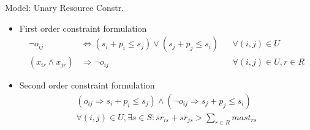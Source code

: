 \documentclass{beamer}
\begin{document}
\begin{frame}{Model: Unary Resource Constr.}
	\begin{itemize}
		\item First order constraint formulation
		\begin{align}
		    \neg o_{ij} 
		    & \Leftrightarrow (s_{i} + p_{i} \leq s_{j}) \vee (s_{j} + p_{j} \leq s_{i})
		    && \forall (i, j) \in U \nonumber\\
		    (x_{ir} \wedge x_{jr}) 
		    & \Rightarrow \neg o_{ij}
		    && \forall (i, j) \in U, r\in R\nonumber
		\end{align}\pause
		\vspace{3mm}
		\item Second order constraint formulation
		\begin{multline}
		    (o_{ij} \Rightarrow s_i + p_{i} \leq s_{j}) \wedge
		    (\neg o_{ij} \Rightarrow s_{j} + p_{j} \leq s_{i})
		    \\
		    \forall (i, j) \in U, \exists s\in S: 
		        sr_{is} + sr_{js} > \sum\nolimits_{r\in R} mast_{rs}\nonumber
		\end{multline}
	\end{itemize}
\end{frame}


\end{document}
